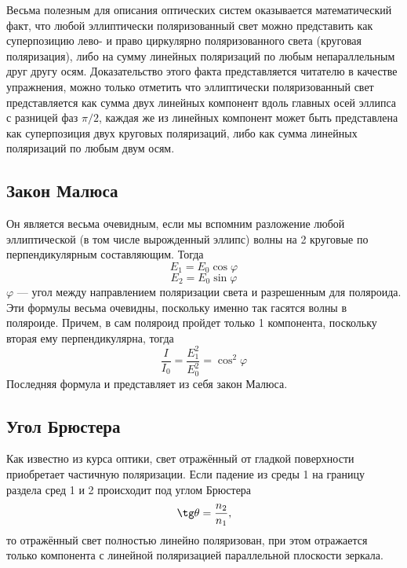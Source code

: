 \documentclass[a4paper, 12pt]{article}%
\begin{document}
Весьма полезным для описания оптических систем оказывается математический
факт, что любой эллиптически поляризованный свет можно представить как суперпозицию лево- и право циркулярно поляризованного света (круговая поляризация), либо на сумму линейных поляризаций по любым непараллельным друг другу осям. Доказательство этого факта представляется читателю в качестве упражнения, можно только отметить что эллиптически поляризованный свет представляется как сумма двух линейных компонент вдоль главных осей эллипса с разницей фаз $\pi/2$, каждая же из линейных компонент может быть представлена как суперпозиция двух круговых поляризаций, либо как сумма линейных поляризаций по любым двум осям.
\subsection*{Закон Малюса}
Он является весьма очевидным, если мы вспомним разложение любой эллиптической (в том числе вырожденный эллипс) волны на 2 круговые по перпендикулярным составляющим. Тогда
\[E_1 = E_0 \cos \varphi\]
\[E_2 = E_0 \sin \varphi\]
$\varphi$ --- угол между направлением поляризации света и разрешенным для поляроида. Эти формулы весьма очевидны, поскольку именно так гасятся волны в поляроиде. Причем, в сам поляроид пройдет только 1 компонента, поскольку вторая ему перпендикулярна, тогда
\[\frac{I}{I_0} = \frac{E_1^2}{E_0^2} = \cos^2\varphi\]
Последняя формула и представляет из себя закон Малюса.
\subsection*{Угол Брюстера}
Как известно из курса оптики, свет отражённый от гладкой поверхности приобретает частичную поляризации. Если падение из среды 1 на границу раздела сред 1 и 2 происходит под углом Брюстера 
\[\tg \theta = \frac{n_2}{n_1},\] то отражённый свет полностью линейно поляризован, при этом отражается только компонента с линейной поляризацией параллельной плоскости зеркала.
\end{document}
